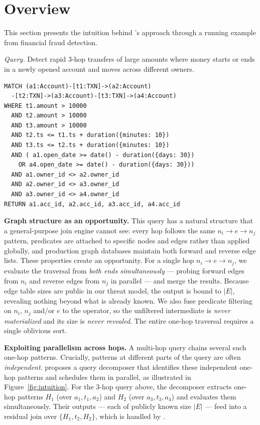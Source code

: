 \section{Overview}
\label{sec:overview}

This section presents the intuition behind \system's approach through a 
running example from financial fraud detection.

\noindent\textit{Query.} Detect rapid 3-hop transfers of large amounts where 
money starts or ends in a newly opened account and moves across different 
owners.

\begin{verbatim}
MATCH (a1:Account)-[t1:TXN]->(a2:Account)
  -[t2:TXN]->(a3:Account)-[t3:TXN]->(a4:Account)
WHERE t1.amount > 10000
  AND t2.amount > 10000
  AND t3.amount > 10000
  AND t2.ts <= t1.ts + duration({minutes: 10})
  AND t3.ts <= t2.ts + duration({minutes: 10})
  AND ( a1.open_date >= date() - duration({days: 30})
    OR a4.open_date >= date() - duration({days: 30}))
  AND a1.owner_id <> a2.owner_id
  AND a2.owner_id <> a3.owner_id
  AND a3.owner_id <> a4.owner_id
RETURN a1.acc_id, a2.acc_id, a3.acc_id, a4.acc_id
\end{verbatim}

\noindent\textbf{Graph structure as an opportunity.} This query has a 
natural structure that a general-purpose join engine cannot see: every hop 
follows the same $n_i \rightarrow e \rightarrow n_j$ pattern, predicates 
are attached to specific nodes and edges rather than applied globally, and 
production graph databases maintain both forward and reverse edge lists.
These properties 
create an opportunity. For a single hop $n_i \rightarrow e \rightarrow n_j$, 
we evaluate the traversal from \emph{both ends simultaneously} --- 
probing forward edges from $n_i$ and reverse edges from $n_j$ in parallel 
--- and merge the results. Because edge table sizes are public in our threat 
model, the output is bound to $|E|$, revealing 
nothing beyond what is already known. We also fuse predicate filtering 
on $n_i$, $n_j$ and/or $e$ to the \onehop operator, so the unfiltered intermediate 
is \emph{never materialized} and its size is \emph{never revealed}. The 
entire one-hop traversal requires a single oblivious sort.

\noindent\textbf{Exploiting parallelism across hops.} A multi-hop query 
chains several such one-hop patterns. Crucially, patterns at different parts of the 
query are often \emph{independent}. \system proposes a query decomposer that
identifies these independent one-hop patterns and schedules them in 
parallel, as illustrated in Figure~\ref{fig:intuition}. For the 3-hop 
query above, the decomposer extracts one-hop patterns $H_1$ 
(over $a_1, t_1, a_2$) and $H_2$ (over $a_3, t_3, a_4$) and evaluates 
them simultaneously. Their outputs --- each of publicly known size $|E|$ 
--- feed into a residual join over $\{H_1, t_2, H_2\}$, which is handled
by \wei.

